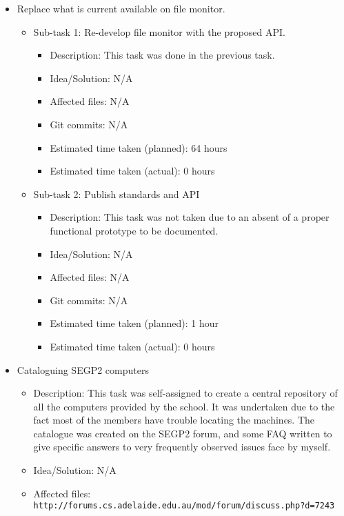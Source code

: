 \begin{itemize}
\begin{itemize}
\begin{itemize}
				\end{itemize}
	     \end{itemize}
	\item Replace what is current available on file monitor.
	     \begin{itemize}
	         \item Sub-task 1: Re-develop file monitor with the proposed API.
	            \begin{itemize}
	              \item Description: This task was done in the previous task. 
					\item Idea/Solution: N/A
					\item Affected files: N/A
					\item Git commits: N/A
					\item Estimated time taken (planned): 64 hours
					\item Estimated time taken (actual): 0 hours
				 \end{itemize}
	         \item Sub-task 2: Publish standards and API
	            \begin{itemize}
				    \item Description: This task was not taken due to an absent of a proper functional prototype to be documented. 
					\item Idea/Solution: N/A 
					\item Affected files: N/A
					\item Git commits: N/A
					\item Estimated time taken (planned): 1 hour
					\item Estimated time taken (actual): 0 hours
				 \end{itemize}
	     \end{itemize}
	\item Cataloguing SEGP2 computers
	     \begin{itemize}
	         \item Description: This task was self-assigned to create a central repository of all the computers provided by the school. It was undertaken due to the fact most of the members have trouble locating the machines. The catalogue was created on the SEGP2 forum, and some FAQ written to give specific answers to very frequently observed issues face by myself. 
	         \item Idea/Solution: N/A
	         \item Affected files: \texttt{http://forums.cs.adelaide.edu.au/mod/forum/discuss.php?d=7243}

\end{itemize}
\end{itemize}
